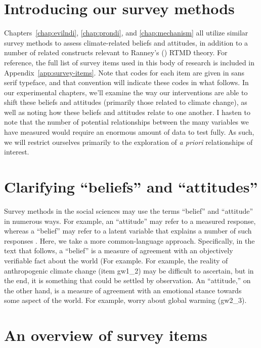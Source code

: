 \graphicspath{{survey-methods/}}

\section{Introducing our survey methods}
\label{chap:survey}

Chapters~\ref{chap:evilndi}, \ref{chap:prondi}, and \ref{chap:mechanism} all
utilize similar survey methods to assess climate-related beliefs and attitudes,
in addition to a number of related constructs relevant to Ranney's
(\citeyear{ranney_why_2012}) RTMD theory. For reference, the full list of survey
items used in this body of research is included in
Appendix~\ref{app:survey-items}. Note that codes for each item are given in
\textsf{sans serif} typeface, and that convention will indicate these codes in
what follows. In our experimental chapters, we'll examine the way our
interventions are able to shift these beliefs and attitudes (primarily those
related to climate change), as well as noting how these beliefs and attitudes
relate to one another.  I hasten to note that the number of potential
relationships between the many variables we have measured would require an
enormous amount of data to test fully. As such, we will restrict ourselves
primarily to the exploration of \emph{a priori} relationships of interest.

\section{Clarifying \texorpdfstring{“beliefs”}{"beliefs"} and
    \texorpdfstring{“attitudes”}{"attitudes"}}

Survey methods in the social sciences may use the terms “belief” and “attitude”
in numerous ways. For example, an “attitude” may refer to a measured response,
whereas a “belief” may refer to a latent variable that explains a number of such
responses \cite{attitude-latent-var-ref}. Here, we take a more common-language
approach. Specifically, in the text that follows, a “belief” is a measure of
agreement with an objectively verifiable fact about the world (For example. For
example, the reality of anthropogenic climate change (item \textsf{gw1_2}) may
be difficult to ascertain, but in the end, it is something that could be settled
by observation. An “attitude,” on the other hand, is a measure of agreement with
an emotional stance towards some aspect of the world. For example, worry about
global warming (\textsf{gw2_3}).

\section{An overview of survey items}

